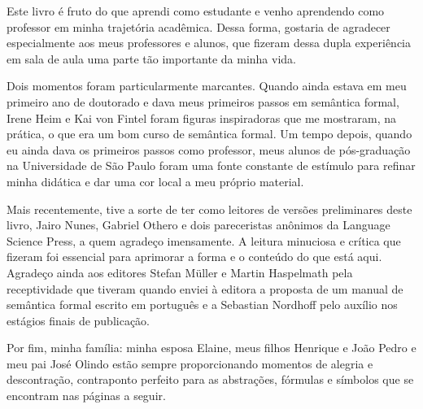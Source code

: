 \begin{refsection}


Este livro é fruto do que aprendi como estudante e venho aprendendo como professor em minha trajetória acadêmica. Dessa forma, gostaria de agradecer especialmente aos meus professores e alunos, que fizeram dessa dupla experiência em sala de aula uma parte tão importante da minha vida. 

Dois momentos foram particularmente marcantes. Quando ainda estava em meu primeiro ano de doutorado e dava meus primeiros passos em semântica formal, Irene Heim e Kai von Fintel foram figuras inspiradoras que me mostraram, na prática, o que era um bom curso de semântica formal. Um tempo depois, quando eu ainda dava os primeiros passos como professor, meus alunos de pós-graduação na Universidade de São Paulo foram uma fonte constante de estímulo para refinar minha didática e dar uma cor local a meu próprio material.

Mais recentemente, tive a sorte de ter como leitores de versões preliminares deste livro, Jairo Nunes, Gabriel Othero e dois pareceristas anônimos da Language Science Press, a quem agradeço imensamente. A leitura minuciosa e crítica que fizeram foi essencial para aprimorar a forma e o conteúdo do que está aqui. Agradeço ainda aos  editores Stefan M\"{u}ller e Martin Haspelmath pela receptividade que tiveram quando enviei à editora a proposta de um manual de semântica formal escrito em português e a Sebastian Nordhoff pelo auxílio nos estágios finais de publicação.

Por fim, minha família: minha esposa Elaine, meus filhos Henrique e João Pedro e meu pai José Olindo estão sempre proporcionando momentos de alegria e descontração, contraponto perfeito para as abstrações, fórmulas e símbolos que se encontram nas páginas a seguir.   



\end{refsection}

